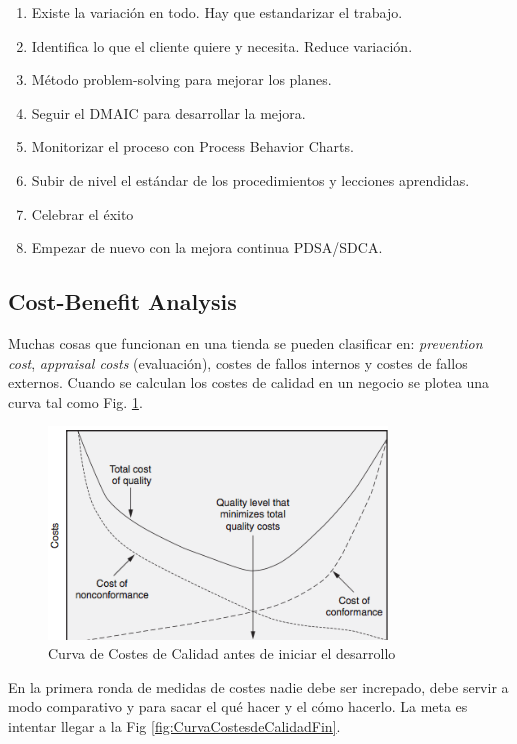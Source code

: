 \documentclass[]{article}
\begin{document}
\begin{enumerate}
	\item Existe la variación en todo. Hay que estandarizar el trabajo.
	\item Identifica lo que el cliente quiere y necesita. Reduce variación.
	\item Método problem-solving para mejorar los planes.
	\item Seguir el DMAIC para desarrollar la mejora.
	\item Monitorizar el proceso con Process Behavior Charts.
	\item Subir de nivel el estándar de los procedimientos y lecciones aprendidas.
	\item Celebrar el éxito
	\item Empezar de nuevo con la mejora continua PDSA/SDCA.
\end{enumerate}

\subsection{Cost-Benefit Analysis}

Muchas cosas que funcionan en una tienda se pueden clasificar en: \textit{prevention cost}, \textit{appraisal costs} (evaluación), costes de fallos internos y costes de fallos externos. 
Cuando se calculan los costes de calidad en un negocio se plotea una curva tal como Fig. \ref{fig:CurvaCostesdeCalidadInicio}.
\begin{figure}[ht!]
\centering
\includegraphics[width=90mm]{imagenes/CurvaCostesCalidadInicio.png}
\caption{Curva de Costes de Calidad antes de iniciar el desarrollo}
\label{fig:CurvaCostesdeCalidadInicio}
\end{figure}

En la primera ronda de medidas de costes nadie debe ser increpado, debe servir a modo comparativo y para sacar el qué hacer y el cómo hacerlo. La meta es intentar llegar a la Fig \ref{fig:CurvaCostesdeCalidadFin}.
\end{document}
